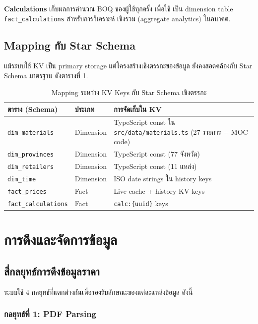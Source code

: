\textbf{Calculations} เก็บผลการคำนวณ BOQ ของผู้ใช้ทุกครั้ง เพื่อใช้
เป็น dimension table \texttt{fact\_calculations} สำหรับการวิเคราะห์
เชิงรวม (aggregate analytics) ในอนาคต.

\subsection{Mapping กับ Star Schema}

แม้ระบบใช้ KV เป็น primary storage แต่โครงสร้างเชิงตรรกะของข้อมูล
ยังคงสอดคล้องกับ Star Schema มาตรฐาน ดังตารางที่ \ref{tab:star-schema}.

\begin{table}[H]
\centering
\caption{Mapping ระหว่าง KV Keys กับ Star Schema เชิงตรรกะ}
\label{tab:star-schema}
\begin{tabularx}{\textwidth}{l X X}
\toprule
\textbf{ตาราง (Schema)} & \textbf{ประเภท} & \textbf{การจัดเก็บใน KV} \\
\midrule
\texttt{dim\_materials}    & Dimension & TypeScript const ใน \texttt{src/data/materials.ts} (27 รายการ + MOC code) \\
\texttt{dim\_provinces}    & Dimension & TypeScript const (77 จังหวัด) \\
\texttt{dim\_retailers}    & Dimension & TypeScript const (11 แหล่ง) \\
\texttt{dim\_time}         & Dimension & ISO date strings ใน history keys \\
\texttt{fact\_prices}      & Fact      & Live cache + history KV keys \\
\texttt{fact\_calculations}& Fact      & \texttt{calc:\{uuid\}} keys \\
\bottomrule
\end{tabularx}
\end{table}

\section{การดึงและจัดการข้อมูล}
\label{sec:data-acquire}



\subsection{สี่กลยุทธ์การดึงข้อมูลราคา}

ระบบใช้ 4 กลยุทธ์ที่แตกต่างกันเพื่อรองรับลักษณะของแต่ละแหล่งข้อมูล
ดังนี้

\subsubsection{กลยุทธ์ที่ 1: PDF Parsing}

